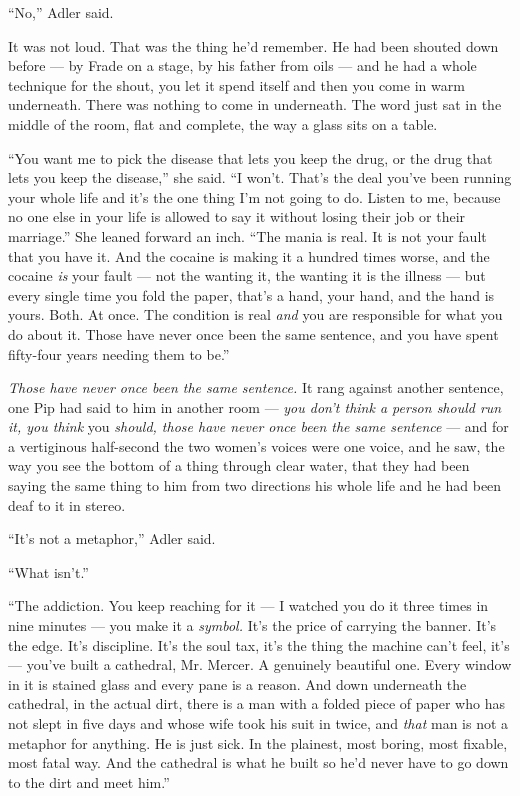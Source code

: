 \documentclass[11pt,openany]{book}
\newcommand{\scenebreak}{\par\vspace{0.5\baselineskip}\begin{center}\textasteriskcentered\quad\textasteriskcentered\quad\textasteriskcentered\end{center}\vspace{0.5\baselineskip}\par}
\begin{document}
``No,'' Adler said.


\scenebreak


It was not loud. That was the thing he'd remember. He had been shouted down before --- by Frade on a stage, by his father from oils --- and he had a whole technique for the shout, you let it spend itself and then you come in warm underneath. There was nothing to come in underneath. The word just sat in the middle of the room, flat and complete, the way a glass sits on a table.

``You want me to pick the disease that lets you keep the drug, or the drug that lets you keep the disease,'' she said. ``I won't. That's the deal you've been running your whole life and it's the one thing I'm not going to do. Listen to me, because no one else in your life is allowed to say it without losing their job or their marriage.'' She leaned forward an inch. ``The mania is real. It is not your fault that you have it. And the cocaine is making it a hundred times worse, and the cocaine \textit{is} your fault --- not the wanting it, the wanting it is the illness --- but every single time you fold the paper, that's a hand, your hand, and the hand is yours. Both. At once. The condition is real \textit{and} you are responsible for what you do about it. Those have never once been the same sentence, and you have spent fifty-four years needing them to be.''

\textit{Those have never once been the same sentence.} It rang against another sentence, one Pip had said to him in another room --- \textit{you don't think a person should run it, you think} you \textit{should, those have never once been the same sentence} --- and for a vertiginous half-second the two women's voices were one voice, and he saw, the way you see the bottom of a thing through clear water, that they had been saying the same thing to him from two directions his whole life and he had been deaf to it in stereo.

``It's not a metaphor,'' Adler said.

``What isn't.''

``The addiction. You keep reaching for it --- I watched you do it three times in nine minutes --- you make it a \textit{symbol.} It's the price of carrying the banner. It's the edge. It's discipline. It's the soul tax, it's the thing the machine can't feel, it's --- you've built a cathedral, Mr. Mercer. A genuinely beautiful one. Every window in it is stained glass and every pane is a reason. And down underneath the cathedral, in the actual dirt, there is a man with a folded piece of paper who has not slept in five days and whose wife took his suit in twice, and \textit{that} man is not a metaphor for anything. He is just sick. In the plainest, most boring, most fixable, most fatal way. And the cathedral is what he built so he'd never have to go down to the dirt and meet him.''
\end{document}
